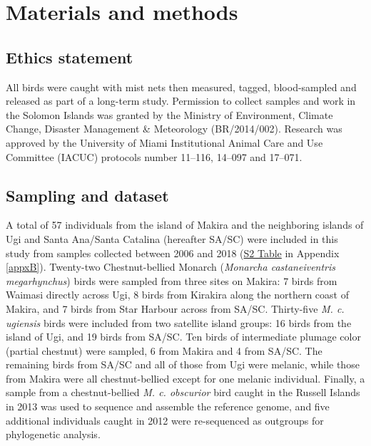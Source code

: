 \section{Materials and methods} \label{mon_methods}

\subsection{Ethics statement}
All birds were caught with mist nets then measured, tagged, blood-sampled and released as part of a long-term study. Permission to collect samples and work in the Solomon Islands was granted by the Ministry of Environment, Climate Change, Disaster Management \& Meteorology (BR/2014/002). Research was approved by the University of Miami Institutional Animal Care and Use Committee (IACUC) protocols number 11–116, 14–097 and 17–071.

\subsection{Sampling and dataset}
A total of 57 individuals from the island of Makira and the neighboring islands of Ugi and Santa Ana/Santa Catalina (hereafter \ac{SA/SC}) were included in this study from samples collected between 2006 and 2018 (\href{https://journals.plos.org/PLOSGENETICS/article?id=10.1371/journal.pgen.1010474#sec017}{S2 Table} in Appendix \ref{appxB}). Twenty-two Chestnut-bellied Monarch (\textit{Monarcha castaneiventris megarhynchus}) birds were sampled from three sites on Makira: 7 birds from Waimasi directly across Ugi, 8 birds from Kirakira along the northern coast of Makira, and 7 birds from Star Harbour across from \ac{SA/SC}. Thirty-five \textit{M. c. ugiensis} birds were included from two satellite island groups: 16 birds from the island of Ugi, and 19 birds from \ac{SA/SC}. Ten birds of intermediate plumage color (partial chestnut) were sampled, 6 from Makira and 4 from \ac{SA/SC}. The remaining birds from \ac{SA/SC} and all of those from Ugi were melanic, while those from Makira were all chestnut-bellied except for one melanic individual. Finally, a sample from a chestnut-bellied \textit{M. c. obscurior} bird caught in the Russell Islands in 2013 was used to sequence and assemble the reference genome, and five additional individuals caught in 2012 were re-sequenced as outgroups for phylogenetic analysis.

